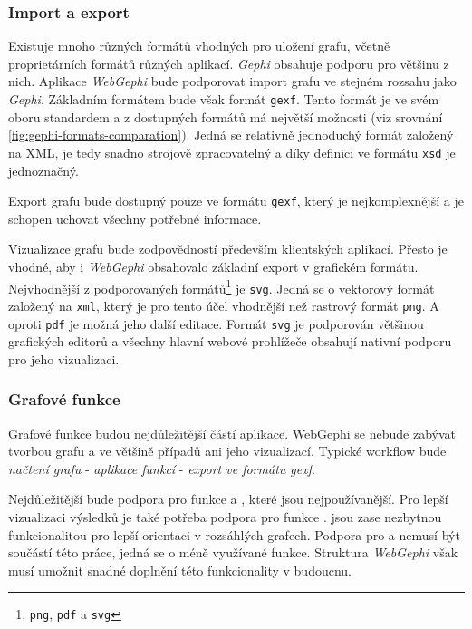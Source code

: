 \documentclass[thesis=M,czech]{FITthesis}[2014/05/6]
\begin{document}
\subsubsection{Import a export}
Existuje mnoho různých formátů vhodných pro uložení grafu, včetně proprietárních formátů různých aplikací. \textit{Gephi} obsahuje podporu
pro většinu z nich. Aplikace \textit{WebGephi} bude podporovat import grafu ve stejném rozsahu jako \textit{Gephi}.
Základním formátem bude však formát \texttt{gexf}. Tento formát je ve svém oboru standardem a z dostupných formátů
má největší možnosti (viz srovnání \ref{fig:gephi-formats-comparation}). Jedná se relativně jednoduchý formát založený na XML, je 
tedy snadno strojově zpracovatelný a díky definici ve formátu \texttt{xsd} je jednoznačný. 

Export grafu bude dostupný pouze ve formátu \texttt{gexf}, který je nejkomplexnější a je schopen uchovat všechny potřebné informace.

Vizualizace grafu bude zodpovědností především klientských aplikací. Přesto je vhodné, aby i \textit{WebGephi} obsahovalo základní export v grafickém formátu.
Nejvhodnější z podporovaných formátů\footnote{\texttt{png}, \texttt{pdf} a \texttt{svg}} je \texttt{svg}. Jedná se o vektorový formát založený na \texttt{xml}, který je pro tento účel
vhodnější než rastrový formát \texttt{png}. A oproti \texttt{pdf} je možná jeho další editace. Formát \texttt{svg} je podporován většinou grafických editorů a všechny
hlavní webové prohlížeče obsahují nativní podporu pro jeho vizualizaci.

\subsubsection{Grafové funkce}
Grafové funkce budou nejdůležitější částí aplikace. WebGephi se nebude zabývat tvorbou grafu a ve většině případů ani jeho vizualizací. Typické workflow 
bude \textit{načtení grafu} - \textit{aplikace funkcí} - \textit{export ve formátu gexf}.

Nejdůležitější bude podpora pro funkce  a , které jsou nejpoužívanější. Pro lepší vizualizaci výsledků
je také potřeba podpora pro funkce .  jsou zase nezbytnou funkcionalitou pro lepší orientaci v rozsáhlých grafech.
Podpora pro  a  nemusí být součástí 
této práce, jedná se o méně využívané funkce. Struktura \textit{WebGephi} však musí umožnit snadné doplnění této funkcionality v budoucnu.
\end{document}
